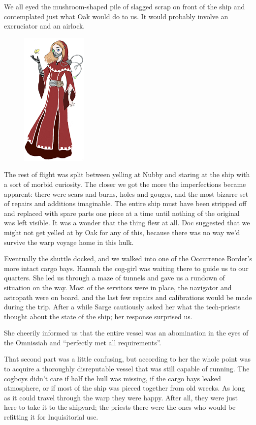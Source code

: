 We all eyed the mushroom-shaped pile of slagged scrap on front of the ship and contemplated just what Oak would do to us. 
It would probably involve an excruciator and an airlock.

\begin{figure}
	\begin{center}
		\includegraphics[width=\figwidth]{pics/7/10.png}
	\end{center}
\end{figure}
The rest of flight was split between yelling at Nubby and staring at the ship with a sort of morbid curiosity. 
The closer we got the more the imperfections became apparent: 
there were scars and burns, holes and gouges, and the most bizarre set of repairs and additions imaginable. 
The entire ship must have been stripped off and replaced with spare parts one piece at a time until nothing of the original was left visible. 
It was a wonder that the thing flew at all. 
Doc suggested that we might not get yelled at by Oak for any of this, because there was no way we’d survive the warp voyage home in this hulk.

Eventually the shuttle docked, and we walked into one of the Occurrence Border’s more intact cargo bays. 
Hannah the cog-girl was waiting there to guide us to our quarters. 
She led us through a maze of tunnels and gave us a rundown of situation on the way. 
Most of the servitors were in place, the navigator and astropath were on board, and the last few repairs and calibrations would be made during the trip. 
After a while Sarge cautiously asked her what the tech-priests thought about the state of the ship; 
her response surprised us.

She cheerily informed us that the entire vessel was an abomination in the eyes of the Omnissiah and “perfectly met all requirements”. 

That second part was a little confusing, but according to her the whole point was to acquire a thoroughly disreputable vessel that was still capable of running. 
The cogboys didn’t care if half the hull was missing, if the cargo bays leaked atmosphere, or if most of the ship was pieced together from old wrecks. 
As long as it could travel through the warp they were happy. 
After all, they were just here to take it to the shipyard; 
the priests there were the ones who would be refitting it for Inquisitorial use.

